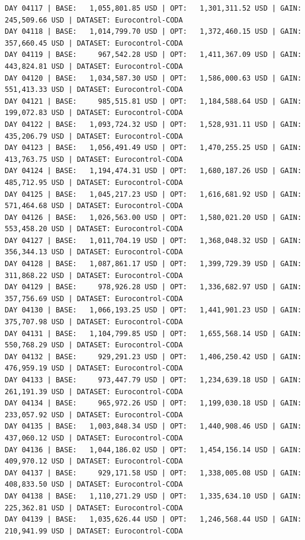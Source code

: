 \documentclass[11pt,a4paper]{article}
\begin{document}
\begin{verbatim}
DAY 04117 | BASE:   1,055,801.85 USD | OPT:   1,301,311.52 USD | GAIN: 245,509.66 USD | DATASET: Eurocontrol-CODA
DAY 04118 | BASE:   1,014,799.70 USD | OPT:   1,372,460.15 USD | GAIN: 357,660.45 USD | DATASET: Eurocontrol-CODA
DAY 04119 | BASE:     967,542.28 USD | OPT:   1,411,367.09 USD | GAIN: 443,824.81 USD | DATASET: Eurocontrol-CODA
DAY 04120 | BASE:   1,034,587.30 USD | OPT:   1,586,000.63 USD | GAIN: 551,413.33 USD | DATASET: Eurocontrol-CODA
DAY 04121 | BASE:     985,515.81 USD | OPT:   1,184,588.64 USD | GAIN: 199,072.83 USD | DATASET: Eurocontrol-CODA
DAY 04122 | BASE:   1,093,724.32 USD | OPT:   1,528,931.11 USD | GAIN: 435,206.79 USD | DATASET: Eurocontrol-CODA
DAY 04123 | BASE:   1,056,491.49 USD | OPT:   1,470,255.25 USD | GAIN: 413,763.75 USD | DATASET: Eurocontrol-CODA
DAY 04124 | BASE:   1,194,474.31 USD | OPT:   1,680,187.26 USD | GAIN: 485,712.95 USD | DATASET: Eurocontrol-CODA
DAY 04125 | BASE:   1,045,217.23 USD | OPT:   1,616,681.92 USD | GAIN: 571,464.68 USD | DATASET: Eurocontrol-CODA
DAY 04126 | BASE:   1,026,563.00 USD | OPT:   1,580,021.20 USD | GAIN: 553,458.20 USD | DATASET: Eurocontrol-CODA
DAY 04127 | BASE:   1,011,704.19 USD | OPT:   1,368,048.32 USD | GAIN: 356,344.13 USD | DATASET: Eurocontrol-CODA
DAY 04128 | BASE:   1,087,861.17 USD | OPT:   1,399,729.39 USD | GAIN: 311,868.22 USD | DATASET: Eurocontrol-CODA
DAY 04129 | BASE:     978,926.28 USD | OPT:   1,336,682.97 USD | GAIN: 357,756.69 USD | DATASET: Eurocontrol-CODA
DAY 04130 | BASE:   1,066,193.25 USD | OPT:   1,441,901.23 USD | GAIN: 375,707.98 USD | DATASET: Eurocontrol-CODA
DAY 04131 | BASE:   1,104,799.85 USD | OPT:   1,655,568.14 USD | GAIN: 550,768.29 USD | DATASET: Eurocontrol-CODA
DAY 04132 | BASE:     929,291.23 USD | OPT:   1,406,250.42 USD | GAIN: 476,959.19 USD | DATASET: Eurocontrol-CODA
DAY 04133 | BASE:     973,447.79 USD | OPT:   1,234,639.18 USD | GAIN: 261,191.39 USD | DATASET: Eurocontrol-CODA
DAY 04134 | BASE:     965,972.26 USD | OPT:   1,199,030.18 USD | GAIN: 233,057.92 USD | DATASET: Eurocontrol-CODA
DAY 04135 | BASE:   1,003,848.34 USD | OPT:   1,440,908.46 USD | GAIN: 437,060.12 USD | DATASET: Eurocontrol-CODA
DAY 04136 | BASE:   1,044,186.02 USD | OPT:   1,454,156.14 USD | GAIN: 409,970.12 USD | DATASET: Eurocontrol-CODA
DAY 04137 | BASE:     929,171.58 USD | OPT:   1,338,005.08 USD | GAIN: 408,833.50 USD | DATASET: Eurocontrol-CODA
DAY 04138 | BASE:   1,110,271.29 USD | OPT:   1,335,634.10 USD | GAIN: 225,362.81 USD | DATASET: Eurocontrol-CODA
DAY 04139 | BASE:   1,035,626.44 USD | OPT:   1,246,568.44 USD | GAIN: 210,941.99 USD | DATASET: Eurocontrol-CODA

\end{verbatim}
\end{document}

